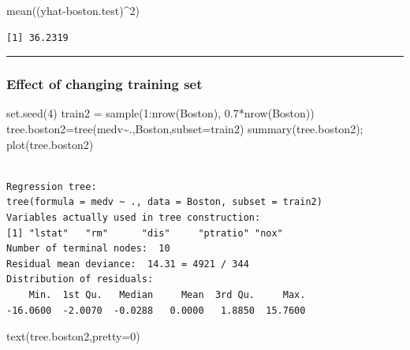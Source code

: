 \documentclass[
  letterpaper,
  DIV=11,
  numbers=noendperiod]{scrartcl}
\newenvironment{Shaded}{\begin{snugshade}}{\end{snugshade}}
\newcommand{\AttributeTok}[1]{\textcolor[rgb]{0.40,0.45,0.13}{#1}}
\newcommand{\DecValTok}[1]{\textcolor[rgb]{0.68,0.00,0.00}{#1}}
\newcommand{\FloatTok}[1]{\textcolor[rgb]{0.68,0.00,0.00}{#1}}
\newcommand{\FunctionTok}[1]{\textcolor[rgb]{0.28,0.35,0.67}{#1}}
\newcommand{\NormalTok}[1]{\textcolor[rgb]{0.00,0.23,0.31}{#1}}
\newcommand{\OtherTok}[1]{\textcolor[rgb]{0.00,0.23,0.31}{#1}}
\newcommand{\SpecialCharTok}[1]{\textcolor[rgb]{0.37,0.37,0.37}{#1}}
\begin{document}
\begin{Shaded}
\begin{Highlighting}[]
\FunctionTok{mean}\NormalTok{((yhat}\SpecialCharTok{{-}}\NormalTok{boston.test)}\SpecialCharTok{\^{}}\DecValTok{2}\NormalTok{)}
\end{Highlighting}
\end{Shaded}

\begin{verbatim}
[1] 36.2319
\end{verbatim}

\begin{center}\rule{0.5\linewidth}{0.5pt}\end{center}

\hypertarget{effect-of-changing-training-set}{%
\subsubsection{Effect of changing training
set}\label{effect-of-changing-training-set}}

\begin{Shaded}
\begin{Highlighting}[]
\FunctionTok{set.seed}\NormalTok{(}\DecValTok{4}\NormalTok{)}
\NormalTok{train2 }\OtherTok{=} \FunctionTok{sample}\NormalTok{(}\DecValTok{1}\SpecialCharTok{:}\FunctionTok{nrow}\NormalTok{(Boston), }\FloatTok{0.7}\SpecialCharTok{*}\FunctionTok{nrow}\NormalTok{(Boston))}
\NormalTok{tree.boston2}\OtherTok{=}\FunctionTok{tree}\NormalTok{(medv}\SpecialCharTok{\textasciitilde{}}\NormalTok{.,Boston,}\AttributeTok{subset=}\NormalTok{train2)}
\FunctionTok{summary}\NormalTok{(tree.boston2); }\FunctionTok{plot}\NormalTok{(tree.boston2)}
\end{Highlighting}
\end{Shaded}

\begin{verbatim}

Regression tree:
tree(formula = medv ~ ., data = Boston, subset = train2)
Variables actually used in tree construction:
[1] "lstat"   "rm"      "dis"     "ptratio" "nox"    
Number of terminal nodes:  10 
Residual mean deviance:  14.31 = 4921 / 344 
Distribution of residuals:
    Min.  1st Qu.   Median     Mean  3rd Qu.     Max. 
-16.0600  -2.0070  -0.0288   0.0000   1.8850  15.7600 
\end{verbatim}

\begin{Shaded}
\begin{Highlighting}[]
\FunctionTok{text}\NormalTok{(tree.boston2,}\AttributeTok{pretty=}\DecValTok{0}\NormalTok{)}
\end{Highlighting}
\end{Shaded}
\end{document}
